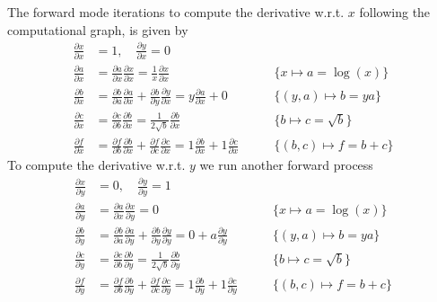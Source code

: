 The forward mode iterations to compute the derivative w.r.t. \(x\)
following the computational graph, is given by
\begin{align*}
  \frac{\partial x}{\partial x} &= 1, \quad
  \frac{\partial y}{\partial x} = 0\\
  \frac{\partial a}{\partial x} &=
  \frac{\partial a}{\partial x} \frac{\partial x}{\partial x} =
  \frac{1}{x} \frac{\partial x}{\partial x} \qquad
  &\{x \mapsto a = \log(x)\}\\
  \frac{\partial b}{\partial x} &=
  \frac{\partial b}{\partial a} \frac{\partial a}{\partial x} +
  \frac{\partial b}{\partial y} \frac{\partial y}{\partial x} =
  y \frac{\partial a}{\partial x} + 0 \qquad
  &\{(y, a) \mapsto b = ya\}\\
  \frac{\partial c}{\partial x} &=
  \frac{\partial c}{\partial b} \frac{\partial b}{\partial x} =
  \frac{1}{2\sqrt{b}} \frac{\partial b}{\partial x} \qquad
  &\{b \mapsto c = \sqrt{b}\}\\
  \frac{\partial f}{\partial x} &=
  \frac{\partial f}{\partial b} \frac{\partial b}{\partial x} +
  \frac{\partial f}{\partial c} \frac{\partial c}{\partial x} =
  1 \frac{\partial b}{\partial x} + 1 \frac{\partial c}{\partial x}
  \qquad &\{(b, c) \mapsto f = b + c\}
\end{align*}
To compute the derivative w.r.t. \(y\) we run another forward process
\begin{align*}
  \frac{\partial x}{\partial y} &= 0, \quad
  \frac{\partial y}{\partial y} = 1\\
  \frac{\partial a}{\partial y} &=
  \frac{\partial a}{\partial x} \frac{\partial x}{\partial y} = 0 \qquad
  &\{x \mapsto a = \log(x)\}\\
  \frac{\partial b}{\partial y} &=
  \frac{\partial b}{\partial a} \frac{\partial a}{\partial y} +
  \frac{\partial b}{\partial y} \frac{\partial y}{\partial y} =
  0 + a \frac{\partial y}{\partial y}\qquad
  &\{(y, a) \mapsto b = ya\}\\
  \frac{\partial c}{\partial y} &=
  \frac{\partial c}{\partial b} \frac{\partial b}{\partial y} =
  \frac{1}{2\sqrt{b}} \frac{\partial b}{\partial y} \qquad
  &\{b \mapsto c = \sqrt{b}\}\\
  \frac{\partial f}{\partial y} &=
  \frac{\partial f}{\partial b} \frac{\partial b}{\partial y} +
  \frac{\partial f}{\partial c} \frac{\partial c}{\partial y} =
  1 \frac{\partial b}{\partial y} + 1 \frac{\partial c}{\partial y}
  \qquad &\{(b, c) \mapsto f = b + c\}
\end{align*}

